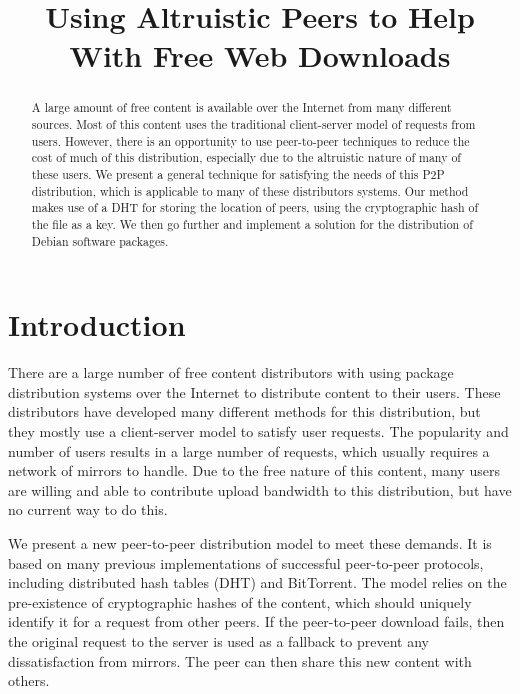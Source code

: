 \documentclass[conference]{IEEEtran}
\begin{document}
\title{Using Altruistic Peers to Help With Free Web Downloads}
\author{
}

\maketitle

\begin{abstract}
A large amount of free content is available over the Internet from
many different sources. Most of this content uses the traditional
client-server model of requests from users. However, there is an
opportunity to use peer-to-peer techniques to reduce the cost of
much of this distribution, especially due to the altruistic nature
of many of these users. We present a general technique for
satisfying the needs of this P2P distribution, which is applicable
to many of these distributors systems. Our method makes use of a DHT
for storing the location of peers, using the cryptographic hash of
the file as a key. We then go further and implement a solution for
the distribution of Debian software packages.
\end{abstract}


\section{Introduction}
\label{intro}

There are a large number of free content distributors with using
package distribution systems over the Internet to distribute content
to their users. These distributors have developed many different
methods for this distribution, but they mostly use a client-server
model to satisfy user requests. The popularity and number of users
results in a large number of requests, which usually requires a
network of mirrors to handle. Due to the free nature of this
content, many users are willing and able to contribute upload
bandwidth to this distribution, but have no current way to do this.

We present a new peer-to-peer distribution model to meet these
demands. It is based on many previous implementations of successful
peer-to-peer protocols, including distributed hash tables (DHT) and
BitTorrent. The model relies on the pre-existence of cryptographic
hashes of the content, which should uniquely identify it for a
request from other peers. If the peer-to-peer download fails, then
the original request to the server is used as a fallback to prevent
any dissatisfaction from mirrors. The peer can then share this new
content with others.
\end{document}
